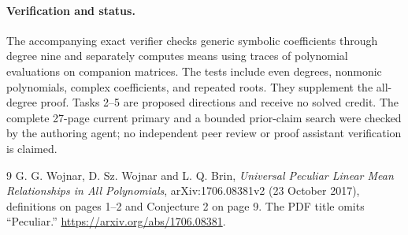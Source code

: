 \documentclass[11pt]{article}
\begin{document}
\paragraph{Verification and status.}
The accompanying exact verifier checks generic symbolic
coefficients through degree nine and separately computes means
using traces of polynomial evaluations on companion matrices.
The tests include even degrees, nonmonic polynomials, complex
coefficients, and repeated roots. They supplement the all-degree
proof. Tasks 2--5 are proposed directions and receive no solved
credit. The complete 27-page current primary and a bounded
prior-claim search were checked by the authoring agent; no
independent peer review or proof assistant verification is claimed.

\begin{thebibliography}{9}
 G. G. Wojnar, D. Sz. Wojnar and L. Q. Brin,
\emph{Universal Peculiar Linear Mean Relationships in All
Polynomials}, arXiv:1706.08381v2 (23 October 2017),
definitions on pages 1--2 and Conjecture 2 on page 9.
The PDF title omits ``Peculiar.''
\url{https://arxiv.org/abs/1706.08381}.
\end{thebibliography}
\end{document}
